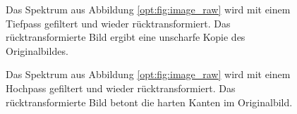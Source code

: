 \begin{figure}
    \centering

    \caption{Das Spektrum aus Abbildung \ref{opt:fig:image_raw} wird mit einem Tiefpass gefiltert und wieder rücktransformiert.
    Das rücktransformierte Bild ergibt eine unscharfe Kopie des Originalbildes.}
    \label{opt:fig:image_lowpass}
\end{figure}

\begin{figure}
    \centering

    \caption{Das Spektrum aus Abbildung \ref{opt:fig:image_raw} wird mit einem Hochpass gefiltert und wieder rücktransformiert.
    Das rücktransformierte Bild betont die harten Kanten im Originalbild.}
    \label{opt:fig:image_highpass}
\end{figure}
